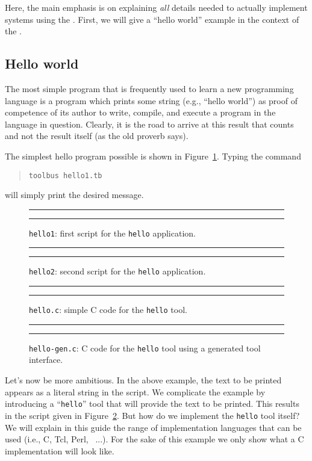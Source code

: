 Here, the main  emphasis is on explaining {\em all} details needed to actually
implement systems using the \TB. First, we will give a ``hello world'' example
in the context of the \TB.

\subsection{\label{Hello}Hello world}
The most simple program that is frequently used to learn a new
programming language is a program which prints some string (e.g.,
``hello world'') as proof of competence of its author to write,
compile, and execute a program in the language in question.  Clearly,
it is the road to arrive at this result that counts and not the result
itself (as the old proverb says).

The simplest hello program possible is shown in Figure~\ref{fig:hello1.tb}.
Typing the command
\begin{quote}
{\tt toolbus hello1.tb}
\end{quote}
will simply print the desired message.

\begin{figure}[tb]
\rule{\textwidth}{0.5mm}

  \caption{{\tt hello1}: first script for the {\tt hello} application.}
  \label{fig:hello1.tb}
\rule{\textwidth}{0.5mm}
\end{figure}

\begin{figure}[tb]
\rule{\textwidth}{0.5mm}

  \caption{{\tt hello2}: second script for the {\tt hello} application.}
  \label{fig:hello2.tb}
\rule{\textwidth}{0.5mm}
\end{figure}

\begin{figure}[tb]
\rule{\textwidth}{0.5mm}

  \caption{{\tt hello.c}: simple C code for the {\tt hello} tool.}
  \label{fig:hello.c}
\rule{\textwidth}{0.5mm}
\end{figure}

\begin{figure}[tb]
\rule{\textwidth}{0.5mm}

  \caption{{\tt hello-gen.c}: C code for the {\tt hello} tool using a generated tool interface.}
  \label{fig:hello-gen.c}
\rule{\textwidth}{0.5mm}
\end{figure}

Let's now be more ambitious. In the above example, the text to be printed
appears as a literal string in the script. We complicate the example
by introducing a ``{\tt hello}'' tool that will provide the text to be printed.
This results in the script given in Figure~\ref{fig:hello2.tb}.
But how do we implement the {\tt hello} tool itself?
We will explain in this guide the range of implementation languages that 
can be used (i.e., C, Tcl, Perl, \ASFSDF\ ...).
For the sake of this example we only show what a C implementation will look like.

